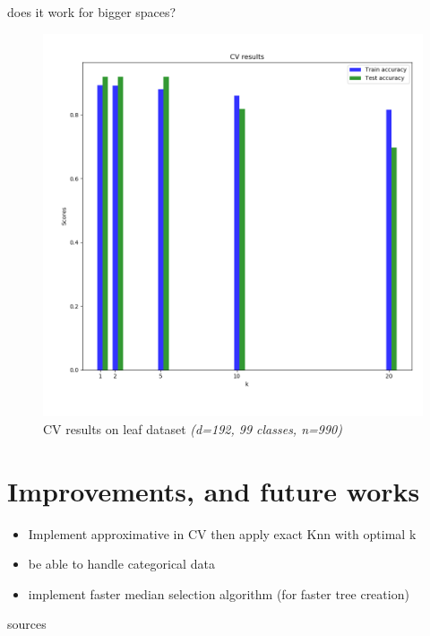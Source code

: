 \documentclass[11 pt]{beamer}
\begin{document}
\begin{frame}{does it work for bigger spaces?}
\begin{figure}
  \includegraphics[width=.55\textwidth]{figures/leafCv.png}
  \caption{CV results on leaf dataset \emph{(d=192, 99 classes, n=990)}}
\end{figure}
\end{frame}

\section{Improvements, and future works}

\begin{frame}
\begin{itemize}
  \item Implement approximative in CV then apply exact Knn with optimal k
  \item be able to handle categorical data
  \item implement faster median selection algorithm (for faster tree creation)
\end{itemize}
\end{frame}

\begingroup
\tiny
\begin{frame}[allowframebreaks]{sources}
  \nocite{*}

  
  
\end{frame}
\endgroup
\end{document}
